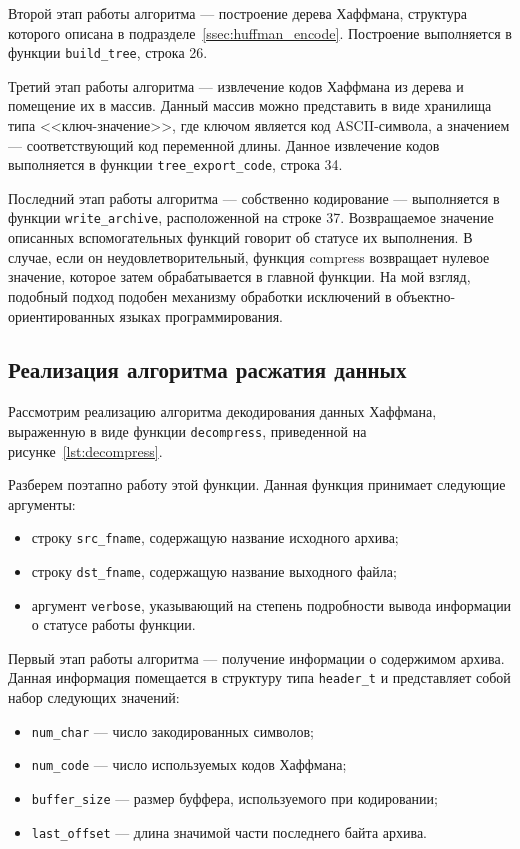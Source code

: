 Второй этап работы алгоритма --- построение дерева Хаффмана, структура которого
описана в подразделе~\ref{ssec:huffman_encode}.
Построение выполняется в функции \texttt{build\_tree}, строка 26.

Третий этап работы алгоритма --- извлечение кодов Хаффмана из дерева и
помещение их в массив. Данный массив можно представить в виде хранилища типа
<<ключ-значение>>, где ключом является код ASCII-символа, 
а значением --- соответствующий код переменной длины.
Данное извлечение кодов выполняется в функции \texttt{tree\_export\_code}, 
строка 34.

Последний этап работы алгоритма --- собственно кодирование --- выполняется
в функции \texttt{write\_archive}, расположенной на строке 37.
Возвращаемое значение описанных вспомогательных функций говорит об статусе
их выполнения.
В случае, если он неудовлетворительный, функция compress возвращает нулевое
значение, которое затем обрабатывается в главной функции.
На мой взгляд, подобный подход подобен механизму
обработки исключений в объектно-ориентированных языках программирования.

\subsection{Реализация алгоритма расжатия данных}

Рассмотрим реализацию алгоритма декодирования данных Хаффмана,
выраженную в виде функции \texttt{decompress},
приведенной на рисунке~\ref{lst:decompress}.

Разберем поэтапно работу этой функции. 
Данная функция принимает следующие аргументы:
\begin{itemize}
\item строку \texttt{src\_fname}, содержащую название исходного архива;
\item строку \texttt{dst\_fname}, содержащую название выходного файла;
\item аргумент \texttt{verbose}, указывающий на степень подробности вывода
  информации о статусе работы функции.
\end{itemize}

Первый этап работы алгоритма --- получение информации о содержимом архива.
Данная информация помещается в структуру типа \texttt{header\_t} и 
представляет собой набор следующих значений:
\begin{itemize}
  \item \texttt{num\_char} --- число закодированных символов;
  \item \texttt{num\_code} --- число используемых кодов Хаффмана;
  \item \texttt{buffer\_size} --- размер буффера, используемого при кодировании;
  \item \texttt{last\_offset} --- длина значимой части последнего байта архива.
\end{itemize}

